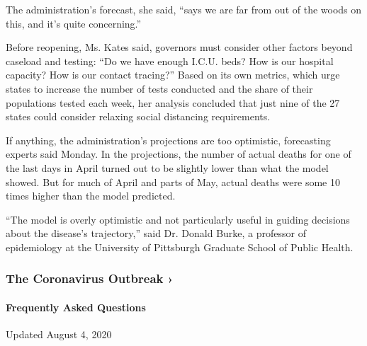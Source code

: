 The administration's forecast, she said, ``says we are far from out of
the woods on this, and it's quite concerning.''

Before reopening, Ms. Kates said, governors must consider other factors
beyond caseload and testing: ``Do we have enough I.C.U. beds? How is our
hospital capacity? How is our contact tracing?'' Based on its own
metrics, which urge states to increase the number of tests conducted and
the share of their populations tested each week, her analysis concluded
that just nine of the 27 states could consider relaxing social
distancing requirements.

If anything, the administration's projections are too optimistic,
forecasting experts said Monday. In the projections, the number of
actual deaths for one of the last days in April turned out to be
slightly lower than what the model showed. But for much of April and
parts of May, actual deaths were some 10 times higher than the model
predicted.

``The model is overly optimistic and not particularly useful in guiding
decisions about the disease's trajectory,'' said Dr. Donald Burke, a
professor of epidemiology at the University of Pittsburgh Graduate
School of Public Health.

\href{https://www.nytimes.com/news-event/coronavirus?action=click\&pgtype=Article\&state=default\&region=MAIN_CONTENT_3\&context=storylines_faq}{}

\hypertarget{the-coronavirus-outbreak-}{%
\subsubsection{The Coronavirus Outbreak
›}\label{the-coronavirus-outbreak-}}

\hypertarget{frequently-asked-questions}{%
\paragraph{Frequently Asked
Questions}\label{frequently-asked-questions}}

Updated August 4, 2020

